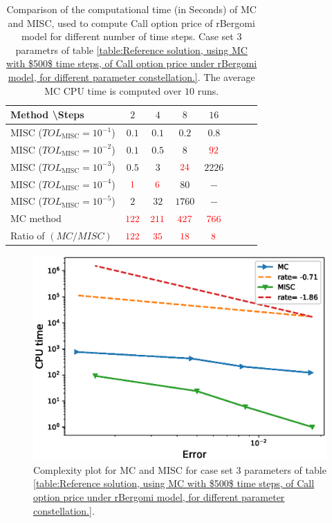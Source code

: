 \begin{table}[h!]
	\centering
	\begin{tabular}{l*{6}{c}r}
		Method \textbackslash  Steps            & $2$ & $4$ & $8$ & $16$ &   \\
		\hline
		MISC ($TOL_{\text{MISC}}=10^{-1}$)  & $0.1$ & $0.1$ & $0.2$ & $0.8$ \\
		MISC ($TOL_{\text{MISC}}=10^{-2}$)  & $0.1$ & $0.5$ & $8$ & $\red{92}$ \\
		MISC ($TOL_{\text{MISC}}=10^{-3}$)  & $0.5$ & $3$ & $\red{24}$ & $2226$ \\
		MISC ($TOL_{\text{MISC}}=10^{-4}$)  & $\red{1}$ & $\red{6}$ & $80$ & $-$\\
		MISC ($TOL_{\text{MISC}}=10^{-5}$)  & $2$ & $32$ & $1760$ & $-$
		 \\
		\hline
		MC method   & $ \red{122}
		
		$  & $  \red{211}$  & $  \red{427}$ & $ \red{766}
		$  \\	
		\hline
		Ratio of $\left(MC/MISC \right)$ & $ \red{122}
		
		$  & $  \red{35}$  & $  \red{  18
		}$ & $ \red{ 8}
		$  \\	
		
		\hline
	\end{tabular}
	\caption{Comparison of the computational time (in Seconds) of  MC and MISC, used to compute Call option price of rBergomi model for different number of time steps. Case set $3$ parametrs of table \ref{table:Reference solution, using MC with $500$ time steps, of Call option price under rBergomi model, for different parameter constellation.}. The average  MC CPU time is computed over $10$ runs. }
	\label{Comparsion of the computational time of  MC and MISC, used to compute Call option price of rBergomi model for different number of time steps. Case set3}
\end{table}

	\begin{figure}[h!]
	\centering
	\includegraphics[width=0.5\linewidth]{./figures/rBergomi_Complexity_rates/set5/error_vs_time_set5}

	\caption{Complexity plot for   MC and MISC for case set $3$ parameters of table \ref{table:Reference solution, using MC with $500$ time steps, of Call option price under rBergomi model, for different parameter constellation.}.}
	\label{fig:Complexity plot for MC and MISC for Case set $3$ parameters}
\end{figure}




